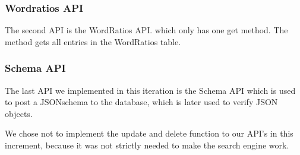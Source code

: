 \subsubsection{Wordratios API}
The second API is the WordRatios API. which only has one get method.
The method gets all entries in the WordRatios table. 

\subsubsection{Schema API}

The last API we implemented in this iteration is the Schema API which is used to post a JSONschema to the database, 
which is later used to verify JSON objects.




We chose not to implement the update and delete function to our API's in this increment, 
because it was not strictly needed to make the search engine work.





    






